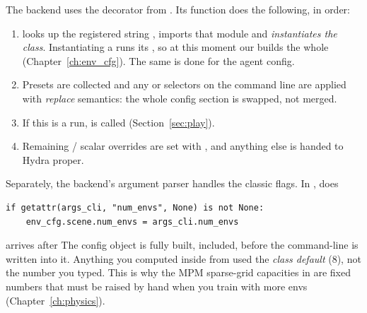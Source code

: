 The backend uses the  decorator from
. Its
 function does the following, in order:

\begin{enumerate}[leftmargin=1.8em]
  \item {} looks up
        the registered string ,
        imports that module and \emph{instantiates the class}. Instantiating a
         runs its , so at this moment
        our  builds the whole
         (Chapter~\ref{ch:env_cfg}). The same is done for the
        agent config.
  \item Presets are collected and any  or
         selectors on the command line are applied with
        \emph{replace} semantics: the whole config section is swapped, not
        merged.
  \item If this is a  run,  is called
        (Section~\ref{sec:play}).
  \item Remaining  /  scalar
        overrides are set with , and anything else is handed to
        Hydra proper.
\end{enumerate}

Separately, the backend's argument parser handles the classic flags. In
,  does

\begin{lstlisting}[numbers=none]
if getattr(args_cli, "num_envs", None) is not None:
    env_cfg.scene.num_envs = args_cli.num_envs
\end{lstlisting}

\begin{warnbox}{ arrives after }
The config object is fully built,  included, before the
command-line  is written into it. Anything you computed
inside  from  used the
\emph{class default} (8), not the number you typed. This is why the MPM
sparse-grid capacities in  are fixed numbers that
must be raised by hand when you train with more envs
(Chapter~\ref{ch:physics}).
\end{warnbox}

